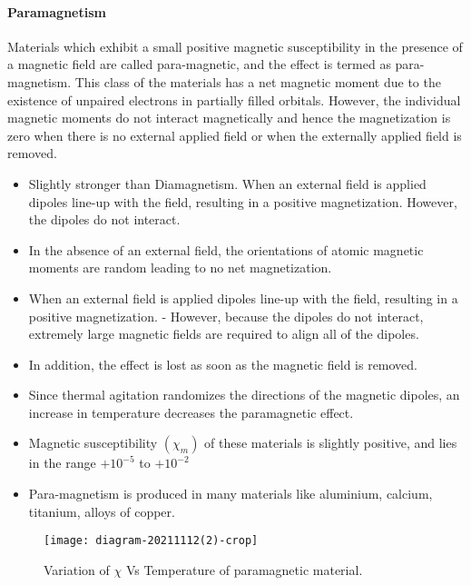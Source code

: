 \paragraph{Paramagnetism}
Materials which exhibit a small positive magnetic susceptibility in the presence of a magnetic field are called para-magnetic, and the effect is termed as para-magnetism.
This class of the materials has a net magnetic moment due to the existence of unpaired electrons in partially filled orbitals. However, the individual magnetic moments do not interact magnetically and hence the magnetization is zero when there is no external applied field or when the externally applied field is removed.
\begin{itemize}
	\item  Slightly stronger than Diamagnetism. When an external field is applied dipoles line-up with the field, resulting in a positive magnetization. However, the dipoles do not interact.
	
	\item In the absence of an external field, the orientations of atomic magnetic moments are random leading to no net magnetization.
	\item  When an external field is applied dipoles line-up with the field, resulting in a positive magnetization.
	- However, because the dipoles do not interact, extremely large magnetic fields are required to align all of the dipoles.
	\item  In addition, the effect is lost as soon as the magnetic field is removed.
	\item  Since thermal agitation randomizes the directions of the magnetic dipoles, an increase in temperature decreases the paramagnetic effect.
	\item Magnetic susceptibility $(\chi_{m})$  of these materials is slightly positive, and lies in the range $+10^{-5}$ to $+10^{-2}$
	\item  Para-magnetism is produced in many materials like aluminium, calcium, titanium, alloys of copper.
\end{itemize}
\begin{figure}[H]
	\centering
	\texttt{[image: diagram-20211112(2)-crop]}
	\caption{Variation of $\chi$ Vs Temperature of paramagnetic material.}
	\label{}
\end{figure}


